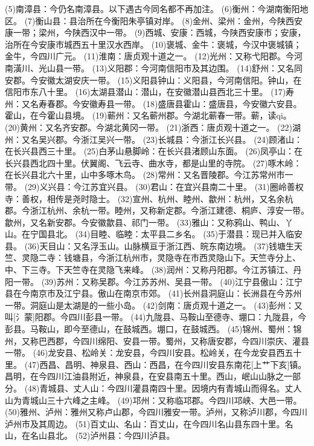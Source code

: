 \documentclass[12pt,UTF8]{ctexbook}
\begin{document}
(5)南漳县：今仍名南漳县。以下遇古今同名都不再加注。
(6)衡州：今湖南衡阳地区。
(7)衡山县：县治所在今衡阳朱亭镇对岸。
(8)金州、梁州：金州，今陕西安康一带；梁州，今陕西汉中一带。
(9)西城、安康：西城，今陕西安康市；安康，治所在今安康市城西五十里汉水西岸。
(10)褒城、金牛：褒城，今汉中褒城镇；金牛，今四川广元。
(11)淮南：唐贞观十道之一。
(12)光州：又称弋阳郡。今河南潢川、光山县一带。
(13)义阳郡：今河南信阳市及其边围。
(14)舒州：又名同安郡。今安徽太湖安庆一带。
(15)义阳县钟山：义阳县，今河南信阳。钟山，在信阳市东八十里。
(16)太湖县潜山：潜山，在安徽潜山县西北三十里。
(17)寿州：又名寿春郡。今安徽寿县一带。
(18)盛唐县霍山：盛唐县，今安徽六安县。霍山，在今霍山县境。
(19)蕲州：又名蕲州郡。今湖北蕲春一带。蕲，读qi。
(20)黄州：又名齐安郡。今湖北黄冈一带。
(21)浙西：唐贞观十道之一。
(22)湖州：又名吴兴郡。今浙江吴兴一带。
(23)长城县：今浙江长兴县。
(24)顾渚山：在长兴县西三十里。
(25)白茅山悬脚岭：在长兴县渚顾山东面。
(26)凤亭山：在长兴县西北四十里。伏翼阁、飞云寺、曲水寺，都是山里的寺院。
(27)啄木岭：在长兴县北六十里，山中多啄木鸟。
(28)常州：又名晋陵郡。今江苏常州市一带。
(29)义兴县：今江苏宜兴县。
(30)君山：在宜兴县南二十里。
(31)圈岭善权寺：善权，相传是尧时隐士。
(32)宣州、杭州、睦州、歙州：杭州，又名余杭郡。今浙江杭州、余杭一带。睦州，又称新定郡。今浙江建德、桐庐、淳安一带。歙州，又名新安郡。今安徽歙县、祁门一带。
(33)雅山：又称鸦山、鸭山、丫山。在宁国县北。
(34)目睦、临睦：太平县二乡名。
(35)于潜县：现已并入临安县。
(36)天目山：又名浮玉山。山脉横亘于浙江西、皖东南边境。
(37)钱塘生天竺、灵隐二寺：钱塘县，今浙江杭州市，灵隐寺在市西灵隐山下。天竺寺分上、中、下三寺。下天竺寺在灵隐飞来峰。
(38)润州：又称丹阳郡。今江苏镇江、丹阳一带。
(39)苏州：又称吴郡。今江苏苏州、吴县一带。
(40)江宁县傲山：江宁县在今南京市及江宁县。傲山在南京市郊。
(41)长州县洞庭山：长洲县在今苏州一带。洞庭山是太湖是的一些小岛。
(42)剑南：唐贞观十道之一。
(43)彭州：又叫[氵蒙]阳郡。今四川彭县一带。
(44)九陇县、马鞍山至德寺、堋口：九陇县，今彭县。马鞍山，即今至德山，在鼓城西。堋口，在鼓城西。
(45)锦州、蜀州：锦州，又称巴西郡，今四川绵阳、安县一带。蜀州，又称唐安郡，今四川崇庆、灌县一带。
(46)龙安县、松岭关：龙安县，今四川安县。松岭关，在今龙安县西五十里。
(47)西昌、昌明、神泉县、西山：西昌，在今四川安县东南花[上艹下亥]镇。昌明，在今四川江油县附近，神泉县，在安县南五十里。西山，岷山山脉之一部分。 
(48)青城县、丈人山：今四川灌县南四十里。因境内有青城山而得名。丈人山为青城山三十六峰之主峰。
(49)邛州：又称临邛郡。今四川邛峡、大邑一带。
(50)雅州、泸州：雅州又称卢山郡，今四川雅安一带。泸州，又称泸川郡，今四川泸州市及其周边。
(51)百丈山、名山：百丈山，在今四川名山县东四十里。名山，在名山县北。
(52)泸州县：今四川泸县。
\end{document}
